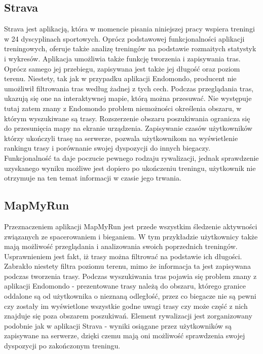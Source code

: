 \subsection{Strava}
Strava \cite{strava} jest aplikacją, która w momencie pisania niniejszej pracy wspiera treningi w 24 dyscyplinach sportowych. Oprócz podstawowej funkcjonalności aplikacji treningowych, oferuje także analizę treningów na podstawie rozmaitych statystyk i wykresów. Aplikacja umożliwia także funkcję tworzenia i zapisywania tras. Oprócz samego jej przebiegu, zapisywana jest także jej długość oraz poziom terenu. Niestety, tak jak w przypadku aplikacji Endomondo, producent nie umożliwił filtrowania tras według żadnej z tych cech. Podczas przeglądania tras, ukazują się one na interaktywnej mapie, którą można przesuwać. Nie występuje tutaj zatem znany z Endomondo problem niemożności określenia obszaru, w którym wyszukiwane są trasy. Rozszerzenie obszaru poszukiwania ogranicza się do przesunięcia mapy na ekranie urządzenia. Zapisywanie czasów użytkowników którzy ukończyli trasę na serwerze, pozwala użytkownikom na wyświetlenie rankingu trasy i porównanie swojej dyspozycji do innych biegaczy. Funkcjonalność ta daje poczucie pewnego rodzaju rywalizacji, jednak sprawdzenie uzyskanego wyniku możliwe jest dopiero po ukończeniu treningu, użytkownik nie otrzymuje na ten temat informacji w czasie jego trwania.
\subsection{MapMyRun}
Przeznaczeniem aplikacji MapMyRun \cite{mapmyrun} jest przede wszystkim śledzenie aktywności związanych ze spacerowaniem i bieganiem. W tym przykładzie użytkownicy także mają możliwość przeglądania i analizowania swoich poprzednich treningów. Usprawnieniem jest fakt, iż trasy można filtrować na podstawie ich długości. Zabrakło niestety filtra poziomu terenu, mimo że informacja ta jest zapisywana podczas tworzenia trasy. Podczas wyszukiwania tras pojawia się problem znany z aplikacji Endomondo - prezentowane trasy należą do obszaru, którego granice oddalone są od użytkownika o nieznaną odległość, przez co biegacze nie są pewni czy zostały im wyświetlone wszystkie godne uwagi trasy czy może część z nich znajduje się poza obszarem poszukiwań. Element rywalizacji jest zorganizowany podobnie jak w aplikacji Strava - wyniki osiągane przez użytkowników są zapisywane na serwerze, dzięki czemu mają oni możliwość sprawdzenia swojej dyspozycji po zakończonym treningu.